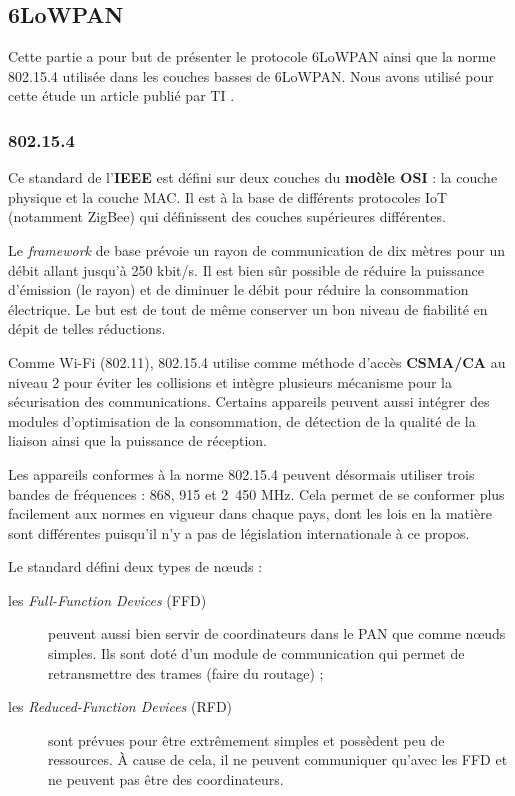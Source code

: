 
\subsection{6LoWPAN}

Cette partie a pour but de présenter le protocole 6LoWPAN ainsi que la norme 802.15.4 utilisée dans les couches basses de 6LoWPAN. Nous avons utilisé pour cette étude un article publié par TI \cite{demystified}.

\subsubsection{802.15.4}

Ce standard de l'\textbf{IEEE} est défini sur deux couches du \textbf{modèle OSI} : la couche physique et la couche MAC. Il est à la base de différents protocoles IoT (notamment ZigBee) qui définissent des couches supérieures différentes. 

Le \textit{framework} de base prévoie un rayon de communication de dix mètres pour un débit allant jusqu'à 250 kbit/s. Il est bien sûr possible de réduire la puissance d'émission (le rayon) et de diminuer le débit pour réduire la consommation électrique. Le but est de tout de même conserver un bon niveau de fiabilité en dépit de telles réductions.

Comme Wi-Fi (802.11), 802.15.4 utilise comme méthode d’accès \textbf{CSMA/CA} au niveau 2 pour éviter les collisions et intègre plusieurs mécanisme pour la sécurisation des communications. Certains appareils peuvent aussi intégrer des modules d'optimisation de la consommation, de détection de la qualité de la liaison ainsi que la puissance de réception. 

Les appareils conformes à la norme 802.15.4 peuvent désormais utiliser trois bandes de fréquences : 868, 915 et 2~450 MHz. Cela permet de se conformer plus facilement aux normes en vigueur dans chaque pays, dont les lois en la matière sont différentes puisqu’il n'y a pas de législation internationale à ce propos.

Le standard défini deux types de nœuds :

\begin{description}
	\item[les \textit{Full-Function Devices} (FFD)] peuvent aussi bien servir de coordinateurs dans le PAN que comme nœuds simples. Ils sont doté d'un module de communication qui permet de retransmettre des trames (faire du routage) ;
	\item[les \textit{Reduced-Function Devices} (RFD)] sont prévues pour être extrêmement simples et possèdent peu de ressources. À cause de cela, il ne peuvent communiquer qu’avec les FFD et ne peuvent pas être des coordinateurs.
\end{description}

